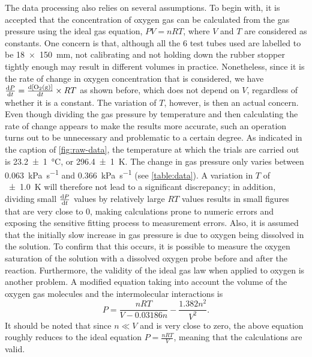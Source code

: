 \documentclass[a4paper, 12pt]{article}
\begin{document}
The data processing also relies on several assumptions. To begin with, it is accepted that the concentration of oxygen gas can be calculated from the gas pressure using the ideal gas equation, $P V = n R T$, where $V$ and $T$ are considered as constants. One concern is that, although all the $6$ test tubes used are labelled to be \SI{18x150}{\mm}, not calibrating and not holding down the rubber stopper tightly enough may result in different volumes in practice. Nonetheless, since it is the rate of change in oxygen concentration that is considered, we have $\dv{P}{t} = \dv{\ce{[O2(g)]}}{t} \times RT$ as shown before, which does not depend on $V$, regardless of whether it is a constant. The variation of $T$, however, is then an actual concern. Even though dividing the gas pressure by temperature and then calculating the rate of change appears to make the results more accurate, such an operation turns out to be unnecessary and problematic to a certain degree. As indicated in the caption of \cref{fig:raw-data}, the temperature at which the trials are carried out is \SI{23.2(10)}{\celsius}, or \SI{296.4(10)}{\kelvin}. The change in gas pressure only varies between \SI{0.063}{\kPa\per\second} and \SI{0.366}{\kPa\per\second} (see \cref{table:data}). A variation in $T$ of \SI{+-1.0}{\kelvin} will therefore not lead to a significant discrepancy; in addition, dividing small $\dv{P}{t}$ values by relatively large $RT$ values results in small figures that are very close to $0$, making calculations prone to numeric errors and exposing the sensitive fitting process to measurement errors. Also, it is assumed that the initially slow increase in gas pressure is due to oxygen being dissolved in the solution. To confirm that this occurs, it is possible to measure the oxygen saturation of the solution with a dissolved oxygen probe before and after the reaction. Furthermore, the validity of the ideal gas law when applied to oxygen is another problem. A modified equation taking into account the volume of the oxygen gas molecules and the intermolecular interactions is \cite{weast_1972} \[ P = \frac{nRT}{V - 0.03186n} - \frac{1.382n^2}{V^2} .\]
It should be noted that since $n \ll V$ and is very close to zero, the above equation roughly reduces to the ideal equation $P = \frac{nRT}{V}$, meaning that the calculations are valid.
\end{document}
